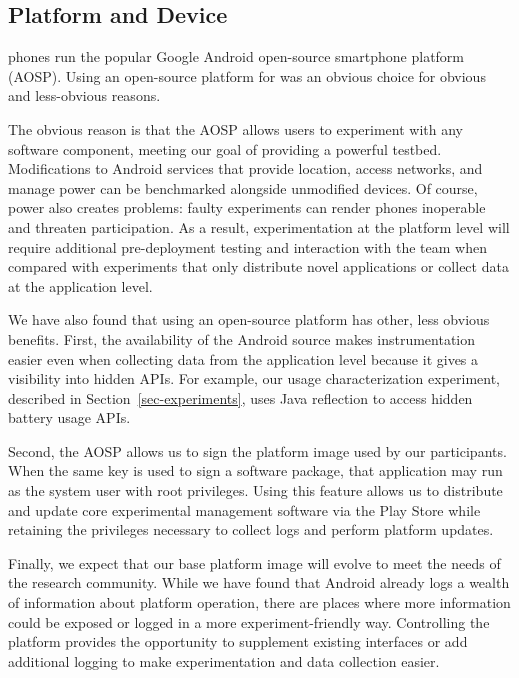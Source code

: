 \subsection{Platform and Device}

\PhoneLab{} phones run the popular Google Android open-source smartphone
platform (AOSP). Using an open-source platform for \PhoneLab{} was an obvious
choice for obvious and less-obvious reasons.

The obvious reason is that the AOSP allows \PhoneLab{} users to experiment
with any software component, meeting our goal of providing a powerful
testbed. Modifications to Android services that provide location, access
networks, and manage power can be benchmarked alongside unmodified devices.
Of course, power also creates problems: faulty experiments can render phones
inoperable and threaten participation. As a result, experimentation at the
platform level will require additional pre-deployment testing and interaction
with the \PhoneLab{} team when compared with experiments that only distribute
novel applications or collect data at the application level.

We have also found that using an open-source platform has other, less obvious
benefits. First, the availability of the Android source makes \PhoneLab{}
instrumentation easier even when collecting data from the application level
because it gives a visibility into hidden APIs. For example, our usage
characterization experiment, described in Section~\ref{sec-experiments}, uses
Java reflection to access hidden battery usage APIs.

Second, the AOSP allows us to sign the platform image used by our
participants. When the same key is used to sign a software package, that
application may run as the system user with root privileges. Using this
feature allows us to distribute and update core \PhoneLab{} experimental
management software via the Play Store while retaining the privileges necessary
to collect logs and perform platform updates.

Finally, we expect that our base \PhoneLab{} platform image will evolve to
meet the needs of the research community. While we have found that Android
already logs a wealth of information about platform operation, there are
places where more information could be exposed or logged in a more
experiment-friendly way. Controlling the platform provides the opportunity to
supplement existing interfaces or add additional logging to make
experimentation and data collection easier.

